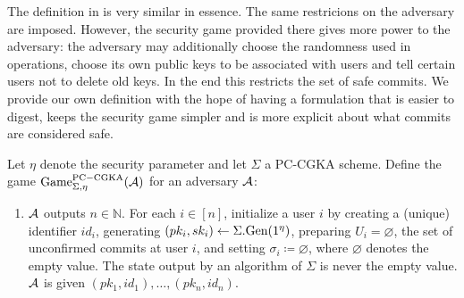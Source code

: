 The definition in \cite[Section B.1]{modular-group-messaging} is very similar in essence. The same restricions on the adversary are imposed. However, the security game provided there gives more power to the adversary: the adversary may additionally choose the randomness used in operations, choose its own public keys to be associated with users and tell certain users not to delete old keys. In the end this restricts the set of safe commits. We provide our own definition with the hope of having a formulation that is easier to digest, keeps the security game simpler and is more explicit about what commits are considered safe.

\begin{definition}
	Let $\eta$ denote the security parameter and let $\Sigma$ a PC-CGKA scheme. Define the game $\mathrm{Game}_{\Sigma, \eta}^{\mathrm{PC-CGKA}}(\mathcal{A})$ for an adversary $\mathcal{A}$:
	\begin{enumerate}[1.]
		\item \label{def:cgka-game-step-init} $\mathcal{A}$ outputs $n \in \mathbb{N}$. For each $i \in [n]$, initialize a user $i$ by creating a (unique) identifier $id_i$, generating $(pk_i, sk_i) \leftarrow \Sigma.\mathrm{Gen}(1^\eta)$, preparing $U_i = \varnothing$, the set of unconfirmed commits at user $i$, and setting $\sigma_i \coloneqq \varnothing$, where $\varnothing$ denotes the empty value. The state output by an algorithm of $\Sigma$ is never the empty value. $\mathcal{A}$ is given $(pk_1, id_1), \ldots, (pk_n, id_n)$.


\end{enumerate}
\end{definition}
